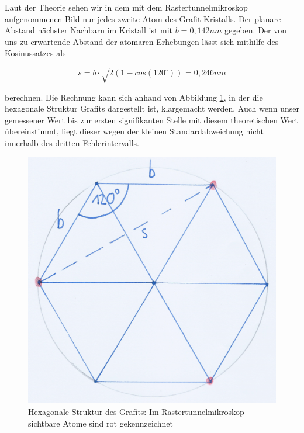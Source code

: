 \documentclass[10pt,a4paper]{article}
\begin{document}
Laut der Theorie sehen wir in dem mit dem Rastertunnelmikroskop aufgenommenen Bild nur jedes zweite Atom des Grafit-Kristalls. Der planare Abstand nächster Nachbarn im Kristall ist mit $b = 0,142 nm$ gegeben. Der von uns zu erwartende Abstand der atomaren Erhebungen lässt sich mithilfe des Kosinussatzes als 

\begin{equation}
	s = b \cdot \sqrt{2(1-cos(120^\circ))} = 0,246 nm
\end{equation}

berechnen. Die Rechnung kann sich anhand von Abbildung \ref{rechnungatomabstand}, in der die hexagonale Struktur Grafits dargestellt ist, klargemacht werden. Auch wenn unser gemessener Wert bis zur ersten signifikanten Stelle mit diesem theoretischen Wert übereinstimmt, liegt dieser wegen der kleinen Standardabweichung nicht innerhalb des dritten Fehlerintervalls.

\begin{figure}[h]
	\centering
	
	\includegraphics[scale = 0.4]{hexagon.jpg}
	
	\caption{Hexagonale Struktur des Grafits: Im Rastertunnelmikroskop sichtbare Atome sind rot gekennzeichnet}
	\label{rechnungatomabstand}
\end{figure}
\end{document}
